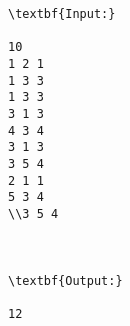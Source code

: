 \begin{verbatim}
\textbf{Input:}

10
1 2 1
1 3 3
1 3 3
3 1 3
4 3 4
3 1 3
3 5 4
2 1 1
5 3 4
\\3 5 4



\textbf{Output:}

12

\end{verbatim}